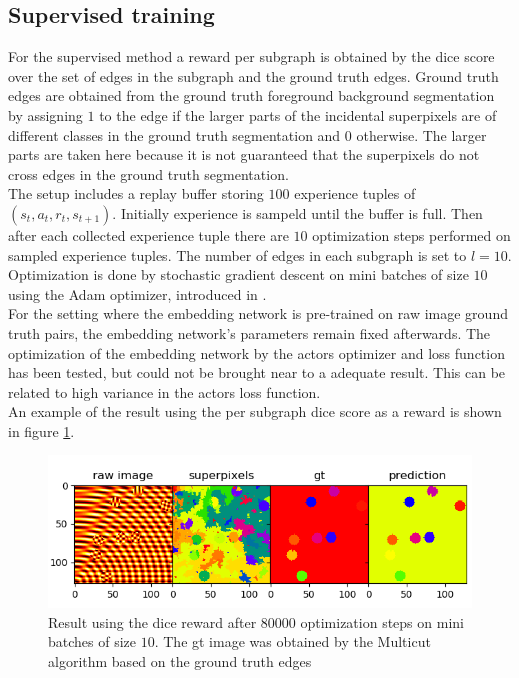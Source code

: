 \subsection{Supervised training}
For the supervised method a reward per subgraph is obtained by the dice score over the set of edges in the subgraph and the ground truth edges. Ground truth edges are obtained from the ground truth foreground background segmentation by assigning $1$ to the edge if the larger parts of the incidental superpixels are of different classes in the ground truth segmentation and $0$ otherwise. The larger parts are taken here because it is not guaranteed that the superpixels do not cross edges in the ground truth segmentation.\\
The setup includes a replay buffer storing $100$ experience tuples of $(s_t, a_t, r_{t}, s_{t+1})$. Initially experience is sampeld until the buffer is full. Then after each collected experience tuple there are $10$ optimization steps performed on sampled experience tuples. The number of edges in each subgraph is set to $l=10$. Optimization is done by stochastic gradient descent on mini batches of size $10$ using the Adam optimizer, introduced in \cite{kingma2014adam}.\\
For the setting where the embedding network is pre-trained on raw image ground truth pairs, the embedding network's parameters remain fixed afterwards. The optimization of the embedding network by the actors optimizer and loss function has been tested, but could not be brought near to a adequate result. This can be related to high variance in the actors loss function.\\
An example of the result using the per subgraph dice score as a reward is shown in figure \ref{fig:resa_dice}.\\

\begin{figure}[ht!]
	\centering
	\includegraphics[width=.7\textwidth]{figures/plots/results_dice_reward.png}
	\caption{Result using the dice reward after $80000$ optimization steps on mini batches of size $10$. The gt image was obtained by the Multicut algorithm based on the ground truth edges}
	\label{fig:resa_dice}
\end{figure}


